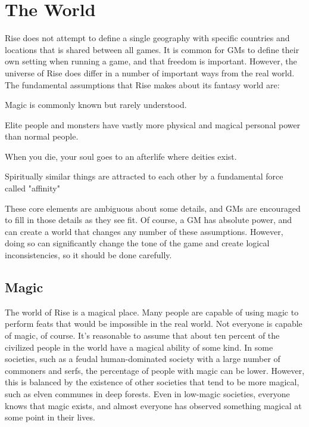 \chapter{The World}

Rise does not attempt to define a single geography with specific countries and locations that is shared between all games.
It is common for GMs to define their own setting when running a game, and that freedom is important.
However, the universe of Rise does differ in a number of important ways from the real world.
The fundamental assumptions that Rise makes about its fantasy world are:

\begin{raggeditemize}
  \item Magic is commonly known but rarely understood.
  \item Elite people and monsters have vastly more physical and magical personal power than normal people.
  \item When you die, your soul goes to an afterlife where deities exist.
  \item Spiritually similar things are attracted to each other by a fundamental force called "affinity"
\end{raggeditemize}

These core elements are ambiguous about some details, and GMs are encouraged to fill in those details as they see fit.
Of course, a GM has absolute power, and can create a world that changes any number of these assumptions.
However, doing so can significantly change the tone of the game and create logical inconsistencies, so it should be done carefully.

\section{Magic}
  The world of Rise is a magical place.
  Many people are capable of using magic to perform feats that would be impossible in the real world.
  Not everyone is capable of magic, of course.
  It's reasonable to assume that about ten percent of the civilized people in the world have a magical ability of some kind.
  In some societies, such as a feudal human-dominated society with a large number of commoners and serfs, the percentage of people with magic can be lower.
  However, this is balanced by the existence of other societies that tend to be more magical, such as elven communes in deep forests.
  Even in low-magic societies, everyone knows that magic exists, and almost everyone has observed something magical at some point in their lives.

